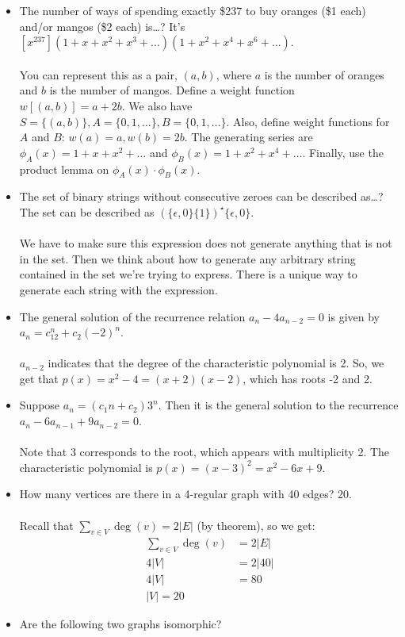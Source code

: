 \documentclass[]{article}
\theoremstyle{definition}
\newcommand{\lecture}[1]{\marginpar{{\footnotesize $\leftarrow$ \underline{#1}}}}
\begin{document}
\begin{itemize}
			\item The number of ways of spending exactly \$237 to buy oranges (\$1 each) and/or mangos (\$2 each) is\dots? It's $[x^{237}](1 + x + x^2 + x^3 + \ldots)(1 + x^2 + x^4 + x^6 + \ldots)$.
				\\ \\
				You can represent this as a pair, $(a, b)$, where $a$ is the number of oranges and $b$ is the number of mangos. Define a weight function $w[(a, b)] = a + 2b$. We also have $S = \{ (a, b) \}, A = \{ 0, 1, \ldots \}, B = \{ 0, 1, \ldots \}$. Also, define weight functions for $A$ and $B$: $w(a) = a, w(b) = 2b$. The generating series are $\phi_A(x) = 1 + x + x^2 + \ldots$ and $\phi_B(x) = 1 + x^2 + x^4 + \ldots$. Finally, use the product lemma on $\phi_A(x) \cdot \phi_B(x)$.

			\item The set of binary strings without consecutive zeroes can be described as\dots? The set can be described as $(\{\epsilon, 0\}\{ 1 \})^\star \{ \epsilon, 0 \}$.
				\\ \\
				We have to make sure this expression does not generate anything that is not in the set. Then we think about how to generate any arbitrary string contained in the set we're trying to express. There is a unique way to generate each string with the expression.
			\item \lecture{February 27, 2013} The general solution of the recurrence relation $a_n - 4a_{n - 2} = 0$ is given by $a_n = c_12^n + c_2(-2)^n$.
				\\ \\
				$a_{n - 2}$ indicates that the degree of the characteristic polynomial is 2. So, we get that $p(x) = x^2 - 4 = (x + 2)(x - 2)$, which has roots -2 and 2.
			\item Suppose $a_n = (c_1n + c_2)3^n$. Then it is the general solution to the recurrence $a_n - 6a_{n-1} + 9a_{n-2} = 0$.
				\\ \\
				Note that 3 corresponds to the root, which appears with multiplicity 2. The characteristic polynomial is $p(x) = (x-3)^2 = x^2 - 6x + 9$.
			\item How many vertices are there in a 4-regular graph with 40 edges? 20.
				\\ \\
				Recall that $\sum_{v \in V} \deg(v) = 2|E|$ (by theorem), so we get:
				\begin{align*}
					\sum_{v \in V} \deg(v) &= 2|E| \\
					4|V| &= 2|40| \\
					4|V| &= 80 \\
					|V| = 20
				\end{align*}
			\item Are the following two graphs isomorphic?
				\begin{center}
\end{center}
\end{itemize}
\end{document}
